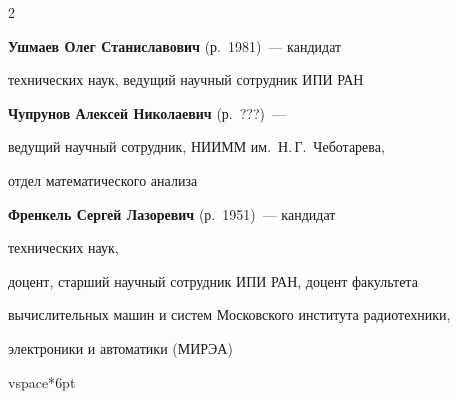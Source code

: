 \begin{multicols}{2}









\noindent

\textbf{Ушмаев Олег Станиславович} (р.\ 1981)~---  кандидат

технических наук, ведущий научный сотрудник ИПИ РАН



\vspace*{9pt}









\noindent

\textbf{Чупрунов Алексей Николаевич} (р.\ ???)~---

ведущий научный сотрудник, НИИММ им.~Н.\,Г.~Чеботарева,

отдел математического анализа






\noindent

\textbf{Френкель Сергей Лазоревич} (р.\ 1951)~---  кандидат\linebreak

технических наук, 

доцент, старший научный сотрудник ИПИ РАН, доцент факультета 

вы\-чис\-ли\-тель\-ных машин и систем Московского института радиотехники,

электроники и автоматики (\mbox{МИРЭА})%



vspace*{6pt}



\noindent


\end{multicols}
